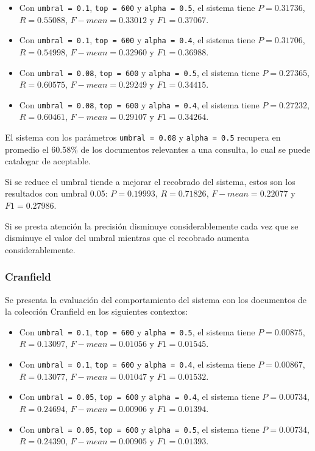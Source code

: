 \begin{itemize}
    \item Con \verb|umbral = 0.1|, \verb|top = 600| y \verb|alpha = 0.5|, el sistema tiene $P = 0.31736$, $R = 0.55088$, $F-mean = 0.33012$ y $F1 = 0.37067$.
    \item Con \verb|umbral = 0.1|, \verb|top = 600| y \verb|alpha = 0.4|, el sistema tiene $P = 0.31706$, $R = 0.54998$, $F-mean = 0.32960$ y $F1 = 0.36988$.
    \item Con \verb|umbral = 0.08|, \verb|top = 600| y \verb|alpha = 0.5|, el sistema tiene $P = 0.27365$, $R = 0.60575$, $F-mean = 0.29249$ y $F1 = 0.34415$.
    \item Con \verb|umbral = 0.08|, \verb|top = 600| y \verb|alpha = 0.4|, el sistema tiene $P = 0.27232$, $R = 0.60461$, $F-mean = 0.29107$ y $F1 = 0.34264$.
\end{itemize}

El sistema con los parámetros \verb|umbral = 0.08| y \verb|alpha = 0.5| recupera en promedio el 60.58\% de los documentos relevantes a una consulta, lo cual se puede catalogar de aceptable. 

Si se reduce el umbral tiende a mejorar el recobrado del sistema, estos son los resultados con umbral 0.05: $P = 0.19993$, $R = 0.71826$, $F-mean = 0.22077$ y $F1 = 0.27986$. 

Si se presta atención la precisión disminuye considerablemente cada vez que se disminuye el valor del umbral mientras que el recobrado aumenta considerablemente.

\subsubsection{Cranfield}

Se presenta la evaluación del comportamiento del sistema con los documentos de la colección Cranfield en los siguientes contextos:

\begin{itemize}
    \item Con \verb|umbral = 0.1|, \verb|top = 600| y \verb|alpha = 0.5|, el sistema tiene $P = 0.00875$, $R = 0.13097$, $F-mean = 0.01056$ y $F1 = 0.01545$.
    \item Con \verb|umbral = 0.1|, \verb|top = 600| y \verb|alpha = 0.4|, el sistema tiene $P = 0.00867$, $R = 0.13077$, $F-mean = 0.01047$ y $F1 = 0.01532$.
    \item Con \verb|umbral = 0.05|, \verb|top = 600| y \verb|alpha = 0.4|, el sistema tiene $P = 0.00734$, $R = 0.24694$, $F-mean = 0.00906$ y $F1 = 0.01394$.
    \item Con \verb|umbral = 0.05|, \verb|top = 600| y \verb|alpha = 0.5|, el sistema tiene $P = 0.00734$, $R = 0.24390$, $F-mean = 0.00905$ y $F1 = 0.01393$.
\end{itemize}

